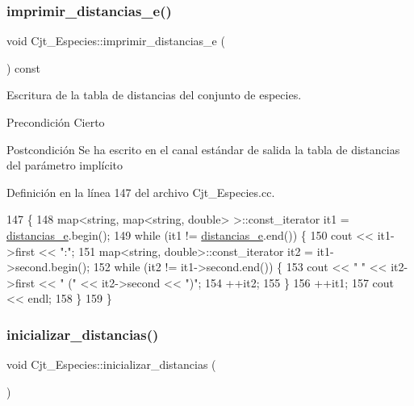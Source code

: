 \subsubsection{\texorpdfstring{imprimir\+\_\+distancias\+\_\+e()}{imprimir\_distancias\_e()}}
{\footnotesize\ttfamily void Cjt\+\_\+\+Especies\+::imprimir\+\_\+distancias\+\_\+e (\begin{DoxyParamCaption}{ }\end{DoxyParamCaption}) const}



Escritura de la tabla de distancias del conjunto de especies. 

\begin{DoxyPrecond}{Precondición}
Cierto 
\end{DoxyPrecond}
\begin{DoxyPostcond}{Postcondición}
Se ha escrito en el canal estándar de salida la tabla de distancias del parámetro implícito 
\end{DoxyPostcond}


Definición en la línea 147 del archivo Cjt\+\_\+\+Especies.\+cc.


\begin{DoxyCode}
147                                                \{
148   map<string, map<string, double> >::const\_iterator it1 = \hyperlink{class_cjt___especies_ad1c8837b7e76b9a7610b65209aa7f5e9}{distancias\_e}.begin();
149   \textcolor{keywordflow}{while} (it1 != \hyperlink{class_cjt___especies_ad1c8837b7e76b9a7610b65209aa7f5e9}{distancias\_e}.end()) \{
150     cout << it1->first << \textcolor{stringliteral}{":"};
151     map<string, double>::const\_iterator it2 = it1->second.begin();
152     \textcolor{keywordflow}{while} (it2 != it1->second.end()) \{
153       cout << \textcolor{stringliteral}{" "} << it2->first << \textcolor{stringliteral}{" ("} << it2->second << \textcolor{stringliteral}{")"};
154       ++it2;
155     \}
156     ++it1;
157     cout << endl;
158   \}
159 \}
\end{DoxyCode}
\mbox{\label{class_cjt___especies_a8c711f5a2b07eca652b6086c28e999bc}} 
\subsubsection{\texorpdfstring{inicializar\+\_\+distancias()}{inicializar\_distancias()}}
{\footnotesize\ttfamily void Cjt\+\_\+\+Especies\+::inicializar\+\_\+distancias (\begin{DoxyParamCaption}{ }\end{DoxyParamCaption})\hspace{0.3cm}{\ttfamily [private]}}



